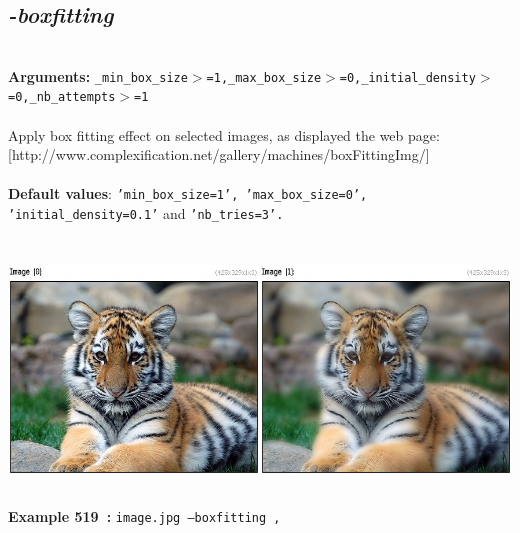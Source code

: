 \documentclass[a4paper,11pt,twoside]{book}
\begin{document}
\subsection{\emph{-boxfitting} }\vspace*{-0.5em}
~\\\textbf{Arguments: } 
{\small \texttt{\_min\_box\_size$>$=1,\_max\_box\_size$>$=0,\_initial\_density$>$=0,\_nb\_attempts$>$=1}}\\~\\
Apply box fitting effect on selected images, as displayed the web page:
[http://www.complexification.net/gallery/machines/boxFittingImg/]
~\\~\\\textbf{Default values}: {\small \texttt{'min\_box\_size=1', 'max\_box\_size=0', 'initial\_density=0.1'} and \texttt{'nb\_tries=3'.}}
\begin{center}\includegraphics[keepaspectratio=true,height=7cm,width=\textwidth]{img/gmic_def519.jpg}\\
{\footnotesize \textbf{Example 519~:} \texttt{image.jpg --boxfitting ,}}
\end{center}
\end{document}
